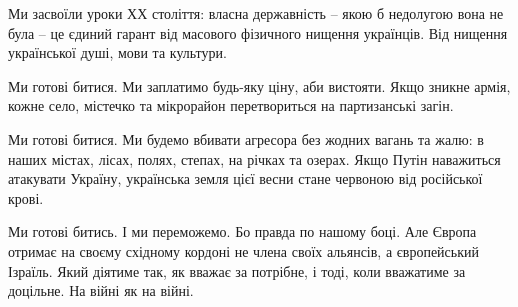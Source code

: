 Ми засвоїли уроки ХХ століття: власна державність – якою б недолугою вона не
була – це єдиний гарант від масового фізичного нищення українців. Від нищення
української душі, мови та культури.

Ми готові битися. Ми заплатимо будь-яку ціну, аби вистояти. Якщо зникне армія,
кожне село, містечко та мікрорайон перетвориться на партизанські загін.

Ми готові битися. Ми будемо вбивати агресора без жодних вагань та жалю: в наших
містах, лісах, полях, степах, на річках та озерах. Якщо Путін наважиться
атакувати Україну, українська земля цієї весни стане червоною від російської
крові.

Ми готові битись. І ми переможемо. Бо правда по нашому боці. Але Європа отримає
на своєму східному кордоні не члена своїх альянсів, а європейський Ізраїль.
Який діятиме так, як вважає за потрібне, і тоді, коли вважатиме за доцільне. На
війні як на війні.

